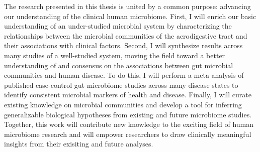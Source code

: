 \documentclass[12pt]{article}
\begin{document}
The research presented in this thesis is united by a common purpose: 
advancing our understanding of the clinical human microbiome.
First, I will enrich our basic understanding of an under-studied 
microbial system by characterizing the relationships between the microbial communities
of the aerodigestive tract and their associations with clinical factors.
Second, I will synthesize results across many studies 
of a well-studied system, moving the field toward 
a better understanding of and consensus on the associations between 
gut microbial communities and human disease. To do this, I will perform a meta-analysis of 
published case-control gut microbiome studies
across many disease states to identify consistent microbial markers of health and disease.
Finally, I will curate
existing knowledge on microbial communities and develop a tool for 
inferring generalizable biological hypotheses from existing and future 
microbiome studies. 
Together, this work will contribute new knowledge
to the exciting field of human microbiome research and will 
empower researchers to draw clinically meaningful insights 
from their exisiting and future analyses.
\end{document}
